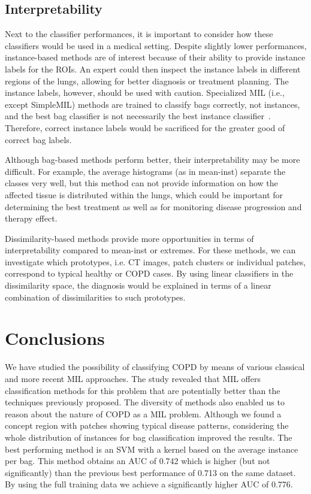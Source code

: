 \documentclass[10pt,conference,a4paper]{IEEEtran}
\begin{document}
\subsection{Interpretability}

Next to the classifier performances, it is important to consider how these classifiers would be used in a medical setting. Despite slightly lower performances, instance-based methods are of interest because of their ability to provide instance labels for the ROIs. An expert could then inspect the instance labels in different regions of the lungs, allowing for better diagnosis or treatment planning. The instance labels, however, should be used with caution. Specialized MIL (i.e., except SimpleMIL) methods are trained to classify bags correctly, not instances, and the best bag classifier is not necessarily the best instance classifier~\cite{tragante2011instance}. Therefore, correct instance labels would be sacrificed for the greater good of correct bag labels.

Although bag-based methods perform better, their interpretability may be more difficult. For example, the average
histograms (as in mean-inst) separate the classes very well, but this method can not provide information on how the
affected tissue is distributed within the lungs, which could be important for determining the best treatment as well as for monitoring disease progression and therapy effect.

Dissimilarity-based methods provide more opportunities in terms of interpretability compared to mean-inst or extremes. For these methods, we can investigate which prototypes, i.e. CT images, patch clusters or individual patches, correspond to typical healthy or COPD cases. By using linear classifiers in the dissimilarity space, the diagnosis would be explained in terms of a linear combination of dissimilarities to such prototypes.



\section{Conclusions}\label{sec:conclusion}

We have studied the possibility of classifying COPD by means of various classical and more recent MIL approaches. The study revealed that MIL offers classification methods for this problem that are potentially better than the techniques previously proposed.  The diversity of methods also enabled us to reason about the nature of COPD as a MIL problem. Although we found a concept region with patches showing typical disease patterns, considering the whole distribution of instances for bag classification improved the results. The best performing method is an SVM with a kernel based on the average instance per bag. This method obtains an AUC of 0.742 which is higher (but not significantly) than the previous best performance of 0.713 on the same dataset. By using the full training data we achieve a significantly higher AUC of 0.776.













\end{document}
